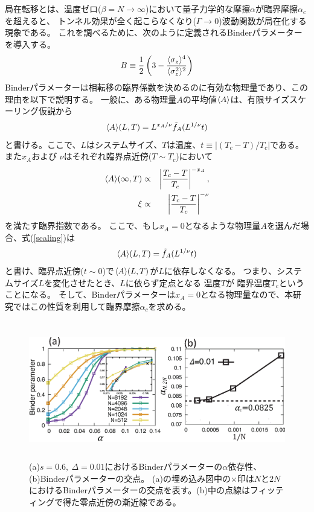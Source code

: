 局在転移とは、温度ゼロ($\beta = N \rightarrow \infty$)において量子力学的な摩擦$\alpha$が臨界摩擦$\alpha_c$を超えると、
トンネル効果が全く起こらなくなり($\Gamma\rightarrow0$)波動関数が局在化する現象である。
これを調べるために、次のように定義されるBinderパラメーターを導入する。
\begin{eqnarray}
	B\equiv\frac{1}{2}\left(3-\frac{\langle\sigma_z\rangle^4}{\langle\sigma_z^2\rangle^2}\right)
\end{eqnarray}
Binderパラメーターは相転移の臨界係数を決めるのに有効な物理量であり、この理由を以下で説明する。
一般に、ある物理量$A$の平均値$\langle A\rangle$は、有限サイズスケーリング仮説から
\begin{eqnarray}
 	\langle A\rangle(L,T)= L^{x_A/\nu}\tilde{f}_A(L^{1/\nu}t)
	\label{scaling}
\end{eqnarray}
と書ける。ここで、$L$はシステムサイズ、$T$は温度、$t\equiv\left|(T_c-T)/T_c\right|$である。
また$x_A$および $\nu$はそれぞれ臨界点近傍($T\sim T_c$)において
 \begin{eqnarray}
  	\langle A\rangle(\infty,T)&\propto&\left|\frac{T_c-T}{T_c}\right|^{-x_A},\\
	\xi&\propto&\left|\frac{T_c-T}{T_c}\right|^{-\nu}
 \end{eqnarray}
を満たす臨界指数である。
ここで、もし$x_A=0$となるような物理量$A$を選んだ場合、式(\ref{scaling})は
\begin{eqnarray}
 	\langle A\rangle(L,T)= \tilde{f}_A(L^{1/\nu}t)
\end{eqnarray}
と書け、臨界点近傍($t\sim0$)で$\langle A\rangle(L,T)$が$L$に依存しなくなる。
つまり、システムサイズ$L $を変化させたとき、$L$に依らず定点となる
温度$T$が 臨界温度$T_c$ということになる。
そして、Binderパラメーターは$x_A=0$となる物理量なので、本研究ではこの性質を利用して臨界摩擦$\alpha_c$を求める。
 
\begin{figure}[tb]
	\centering
	\includegraphics[height=6.0cm]{binder_parameter.eps}
	\caption{
	(a)$s=0.6,\ \Delta=0.01$におけるBinderパラメーターの$\alpha$依存性、(b)Binderパラメーターの交点。 (a)の埋め込み図中の×印は$N$と$2N$におけるBinderパラメーターの交点を表す。(b)中の点線はフィッティングで得た零点近傍の漸近線である。
	}
	\label{fig:binder_parameter}
\end{figure}

